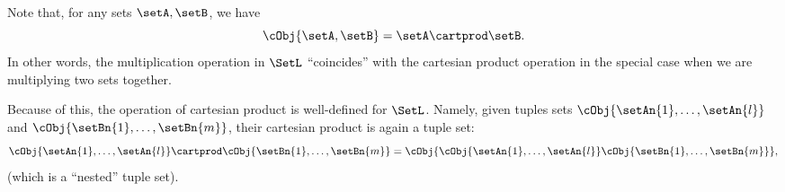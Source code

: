 \begin{remark}
    Note that, for any sets $\setA, \setB$, we have
    \begin{equation}
        \cObj{\setA, \setB} = \setA \cartprod \setB.
    \end{equation}
    In other words, the multiplication operation in $\SetL$ ``coincides'' with the cartesian product operation in the special case when we are multiplying two sets together.

    Because of this, the operation of cartesian product is well-defined for $\SetL$.
    Namely, given tuples sets $\cObj{\setAn{1}, \ldots, \setAn{l}}$ and $\cObj{\setBn{1}, \ldots, \setBn{m}}$, their cartesian product is again a tuple set:
    \begin{equation}
        \cObj{\setAn{1}, \ldots, \setAn{l}} \cartprod \cObj{\setBn{1}, \ldots, \setBn{m}} = \cObj{\cObj{\setAn{1}, \ldots, \setAn{l}} \cObj{\setBn{1}, \ldots, \setBn{m}}},
    \end{equation}
    (which is a ``nested'' tuple set).

\end{remark}

